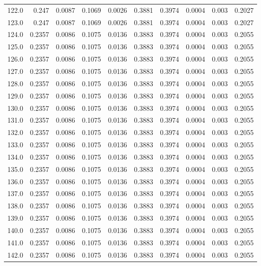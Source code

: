 \begin{longtable}{lrrrrrrrrr}
122.0 & 0.247 & 0.0087 & 0.1069 & 0.0026 & 0.3881 & 0.3974 & 0.0004 & 0.003 & 0.2027 \\
123.0 & 0.247 & 0.0087 & 0.1069 & 0.0026 & 0.3881 & 0.3974 & 0.0004 & 0.003 & 0.2027 \\
124.0 & 0.2357 & 0.0086 & 0.1075 & 0.0136 & 0.3883 & 0.3974 & 0.0004 & 0.003 & 0.2055 \\
125.0 & 0.2357 & 0.0086 & 0.1075 & 0.0136 & 0.3883 & 0.3974 & 0.0004 & 0.003 & 0.2055 \\
126.0 & 0.2357 & 0.0086 & 0.1075 & 0.0136 & 0.3883 & 0.3974 & 0.0004 & 0.003 & 0.2055 \\
127.0 & 0.2357 & 0.0086 & 0.1075 & 0.0136 & 0.3883 & 0.3974 & 0.0004 & 0.003 & 0.2055 \\
128.0 & 0.2357 & 0.0086 & 0.1075 & 0.0136 & 0.3883 & 0.3974 & 0.0004 & 0.003 & 0.2055 \\
129.0 & 0.2357 & 0.0086 & 0.1075 & 0.0136 & 0.3883 & 0.3974 & 0.0004 & 0.003 & 0.2055 \\
130.0 & 0.2357 & 0.0086 & 0.1075 & 0.0136 & 0.3883 & 0.3974 & 0.0004 & 0.003 & 0.2055 \\
131.0 & 0.2357 & 0.0086 & 0.1075 & 0.0136 & 0.3883 & 0.3974 & 0.0004 & 0.003 & 0.2055 \\
132.0 & 0.2357 & 0.0086 & 0.1075 & 0.0136 & 0.3883 & 0.3974 & 0.0004 & 0.003 & 0.2055 \\
133.0 & 0.2357 & 0.0086 & 0.1075 & 0.0136 & 0.3883 & 0.3974 & 0.0004 & 0.003 & 0.2055 \\
134.0 & 0.2357 & 0.0086 & 0.1075 & 0.0136 & 0.3883 & 0.3974 & 0.0004 & 0.003 & 0.2055 \\
135.0 & 0.2357 & 0.0086 & 0.1075 & 0.0136 & 0.3883 & 0.3974 & 0.0004 & 0.003 & 0.2055 \\
136.0 & 0.2357 & 0.0086 & 0.1075 & 0.0136 & 0.3883 & 0.3974 & 0.0004 & 0.003 & 0.2055 \\
137.0 & 0.2357 & 0.0086 & 0.1075 & 0.0136 & 0.3883 & 0.3974 & 0.0004 & 0.003 & 0.2055 \\
138.0 & 0.2357 & 0.0086 & 0.1075 & 0.0136 & 0.3883 & 0.3974 & 0.0004 & 0.003 & 0.2055 \\
139.0 & 0.2357 & 0.0086 & 0.1075 & 0.0136 & 0.3883 & 0.3974 & 0.0004 & 0.003 & 0.2055 \\
140.0 & 0.2357 & 0.0086 & 0.1075 & 0.0136 & 0.3883 & 0.3974 & 0.0004 & 0.003 & 0.2055 \\
141.0 & 0.2357 & 0.0086 & 0.1075 & 0.0136 & 0.3883 & 0.3974 & 0.0004 & 0.003 & 0.2055 \\
142.0 & 0.2357 & 0.0086 & 0.1075 & 0.0136 & 0.3883 & 0.3974 & 0.0004 & 0.003 & 0.2055 \\

\end{longtable}
